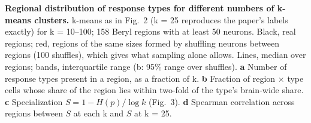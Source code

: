 \caption{\textbf{Regional distribution of response types for different numbers of k-means clusters.} k-means as in Fig.~2 (k = 25 reproduces the paper's labels exactly) for k = 10--100; 158 Beryl regions with at least 50 neurons. Black, real regions; red, regions of the same sizes formed by shuffling neurons between regions (100 shuffles), which gives what sampling alone allows. Lines, median over regions; bands, interquartile range (b: 95\% range over shuffles). \textbf{a} Number of response types present in a region, as a fraction of k. \textbf{b} Fraction of region $\times$ type cells whose share of the region lies within two-fold of the type's brain-wide share. \textbf{c} Specialization $S = 1 - H(p)/\log k$ (Fig.~3). \textbf{d} Spearman correlation across regions between $S$ at each k and $S$ at k = 25.
\label{fig:k_robustness}}
